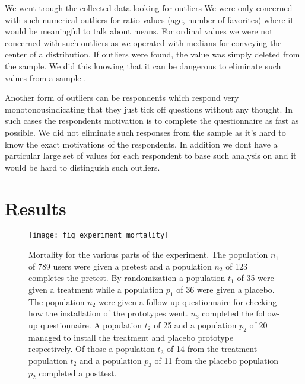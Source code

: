 We went trough the collected data looking for outliers
\dash{}
We were only concerned with such numerical outliers for ratio values
(age, number of favorites) where it would be meaningful to talk about means.
For ordinal values we were not concerned with such outliers as we operated
with medians for conveying the center of a distribution.
If outliers were found, the value was simply deleted from the sample. We did
this knowing that it can be dangerous to eliminate such values from a sample
\citep[]{greene03}.

Another form of outliers can be respondents which respond very
monotonous\dash{}indicating that they just tick off questions without any
thought. In such cases the respondents motivation is to complete the
questionnaire as fast as possible. We did not eliminate such responses from
the sample as it's hard to know the exact motivations of the respondents.
In addition we dont have a particular large set of values for each respondent
to base such analysis on and it would be hard to distinguish such outliers.

\section{Results}

\begin{figure}
  \texttt{[image: fig\_experiment\_mortality]}
  \caption[Experiment Mortality]{
    Mortality for the various parts of the experiment.
    The population $n_1$ of 789 \urort{} users were given a pretest and
    a population $n_2$ of 123 completes the pretest.
    By randomization a population $t_1$ of 35 were given a treatment while
    a population $p_1$ of 36 were given a placebo.
    The population $n_2$ were given a follow-up questionnaire for checking
    how the installation of the prototypes went. $n_3$ completed the follow-up
    questionnaire.
    A population $t_2$ of 25 and a population $p_2$ of 20 managed to install
    the treatment and placebo prototype respectively.
    Of those a population $t_3$ of 14 from the treatment population $t_2$ and
    a population $p_3$ of 11 from the placebo population $p_2$ completed
    a posttest.
  }
  \label{figure:fig.experiment.setup}
\end{figure}

